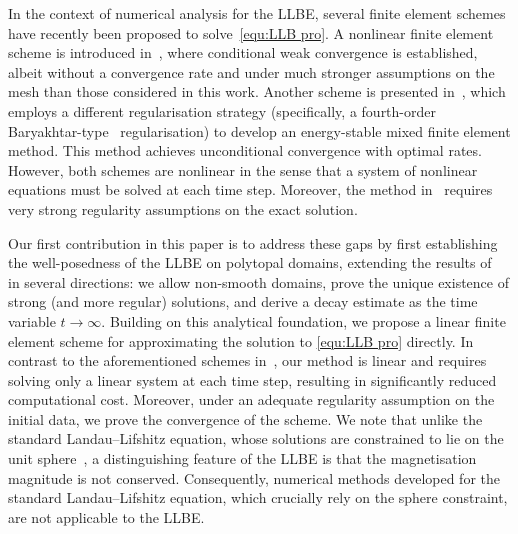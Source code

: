\documentclass[11pt,reqno]{amsart}
\theoremstyle{definition}
\numberwithin{equation}{section}
\begin{document}
In the context of numerical analysis for the LLBE, several finite element schemes have recently been proposed to solve~\eqref{equ:LLB pro}. A nonlinear finite element scheme is introduced in~\citep{BenEssAyo24}, where conditional weak convergence is established, albeit without a convergence rate and under much stronger assumptions on the mesh than those considered in this work. Another scheme is presented in~\citep{Soe25}, which employs a different regularisation strategy (specifically, a fourth-order Baryakhtar-type~\citep{SoeTra23} regularisation) to develop an energy-stable mixed finite element method. This method achieves unconditional convergence with optimal rates. However, both schemes are nonlinear in the sense that a system of nonlinear equations must be solved at each time step. Moreover, the method in~\citep{Soe25} requires very strong regularity assumptions on the exact solution. 

Our first contribution in this paper is to address these gaps by first establishing the well-posedness of the LLBE on polytopal domains, extending the results of~\citep{Le16} in several directions: we allow non-smooth domains, prove the unique existence of strong (and more regular) solutions, and derive a decay estimate as the time variable $t\to \infty$. Building on this analytical foundation, we propose a linear finite element scheme for approximating the solution to \eqref{equ:LLB pro} directly. In contrast to the aforementioned schemes in~\citep{BenEssAyo24, Soe25}, our method is linear and requires solving only a linear system at each time step, resulting in significantly reduced computational cost. Moreover, under an adequate regularity assumption on the initial data, we prove the convergence of the scheme. We note that unlike the standard Landau--Lifshitz equation, whose solutions are constrained to lie on the unit sphere~\citep{Gil55,LL35}, a distinguishing feature of the LLBE is that the magnetisation magnitude is not conserved. 
Consequently, numerical methods developed for the standard Landau--Lifshitz equation, which crucially rely on the sphere constraint, are not applicable to the LLBE.
\end{document}
